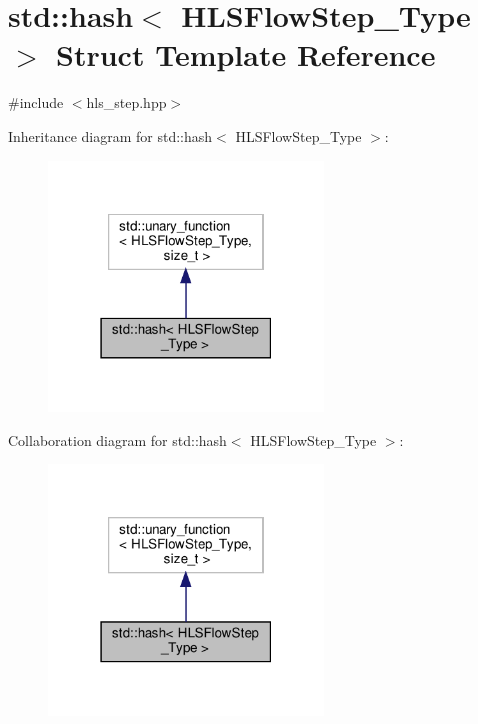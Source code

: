 \hypertarget{structstd_1_1hash_3_01HLSFlowStep__Type_01_4}{}\section{std\+:\+:hash$<$ H\+L\+S\+Flow\+Step\+\_\+\+Type $>$ Struct Template Reference}
\label{structstd_1_1hash_3_01HLSFlowStep__Type_01_4}


{\ttfamily \#include $<$hls\+\_\+step.\+hpp$>$}



Inheritance diagram for std\+:\+:hash$<$ H\+L\+S\+Flow\+Step\+\_\+\+Type $>$\+:
\nopagebreak
\begin{figure}[H]
\begin{center}
\leavevmode
\includegraphics[width=207pt]{de/dbb/structstd_1_1hash_3_01HLSFlowStep__Type_01_4__inherit__graph}
\end{center}
\end{figure}


Collaboration diagram for std\+:\+:hash$<$ H\+L\+S\+Flow\+Step\+\_\+\+Type $>$\+:
\nopagebreak
\begin{figure}[H]
\begin{center}
\leavevmode
\includegraphics[width=207pt]{d2/d5d/structstd_1_1hash_3_01HLSFlowStep__Type_01_4__coll__graph}
\end{center}
\end{figure}
